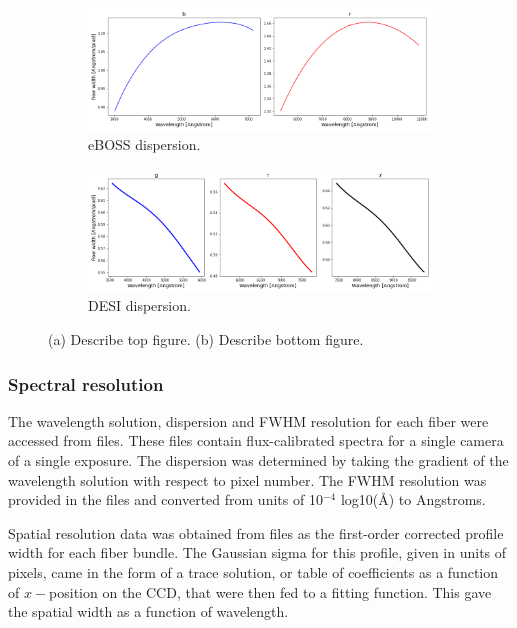 \begin{figure}[h]
\centering
\begin{subfigure}[b]{0.55\textwidth}
   \includegraphics[width=14cm]{images/specsim/eboss_row_width.png}
   \caption{eBOSS dispersion.}
   \label{fig:eboss_disp} 
\end{subfigure}

\begin{subfigure}[b]{0.55\textwidth}
   \includegraphics[width=14cm]{images/specsim/desi_row_width.png}
   \caption{DESI dispersion.}
   \label{fig:desi_disp}
\end{subfigure}
\caption[Two numerical solutions]{(a) Describe top figure. (b) Describe bottom figure.}
\label{fig:disp}
\end{figure}

\subsubsection{Spectral resolution}

The wavelength solution, dispersion and FWHM resolution for each fiber were accessed from  files. These files contain flux-calibrated spectra for a single camera of a single exposure. The dispersion was determined by taking the gradient of the wavelength solution with respect to pixel number. The FWHM resolution was provided in the files and converted from units of 10$^{-4}$ log10($\mbox{\AA}$) to Angstroms.

Spatial resolution data was obtained from  files as the first-order corrected profile width for each fiber bundle. The Gaussian sigma for this profile, given in units of pixels, came in the form of a trace solution, or table of coefficients as a function of $x-$position on the CCD, that were then fed to a fitting function. This gave the spatial width as a function of wavelength.

